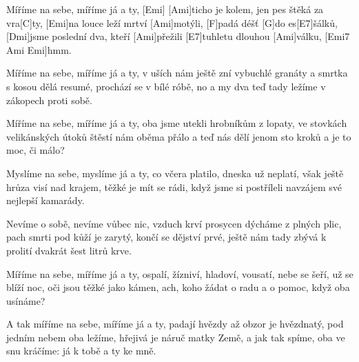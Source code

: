 
\sloka
[Ami]Míříme na sebe, míříme já a ty, [Emi]
[Ami]ticho je kolem, jen pes štěká za vra[C]ty,
[Emi]na louce leží mrtví [Ami]motýli,
[F]padá déšť [G]do es[E7]šálků,
[Dmi]jsme poslední dva, kteří [Ami]přežili
[E7]tuhletu dlouhou [Ami]válku, [Emi7 Ami Emi]hmm.

\sloka
Míříme na sebe, míříme já a ty,
v uších nám ještě zní vybuchlé granáty
a smrtka s kosou dělá resumé,
prochází se v bílé róbě,
no a my dva teď tady ležíme
v zákopech proti sobě.

\sloka
Míříme na sebe, míříme já a ty,
oba jsme utekli hrobníkům z lopaty,
ve stovkách velikánských útoků
štěstí nám oběma přálo
a teď nás dělí jenom sto kroků
a je to moc, či málo?

\sloka
Myslíme na sebe, myslíme já a ty,
co včera platilo, dneska už neplatí,
však ještě hrůza visí nad krajem,
těžké je mít se rádi,
když jsme si postříleli navzájem
své nejlepší kamarády.

\sloka
Nevíme o sobě, nevíme vůbec nic,
vzduch krví prosycen dýcháme z plných plic,
pach smrti pod kůží je zarytý,
končí se dějství prvé,
ještě nám tady zbývá k prolití
dvakrát šest litrů krve.

\sloka
Míříme na sebe, míříme já a ty,
ospalí, žízniví, hladoví, vousatí,
nebe se šeří, už se blíží noc,
oči jsou těžké jako kámen,
ach, koho žádat o radu a o pomoc,
když oba usínáme?

\sloka
A tak míříme na sebe, míříme já a ty,
padají hvězdy až obzor je hvězdnatý,
pod jedním nebem oba ležíme,
hřejivá je náruč matky Země,
a jak tak spíme, oba ve snu kráčíme:
já k tobě a ty ke mně.
